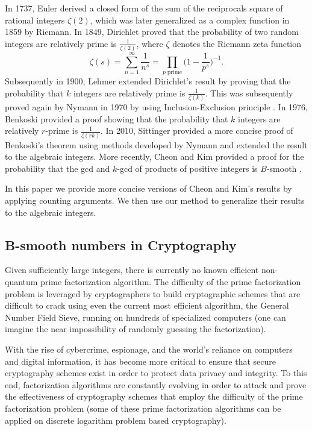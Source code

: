 \documentclass[12pt]{amsart}
\theoremstyle{definition}
\begin{document}
In 1737, Euler derived a closed form of the sum of the reciprocals square of rational integers $\zeta(2)$, which was later generalized as a complex function in 1859 by Riemann. In 1849, Dirichlet \cite{Dirichlet} proved that the probability of two random integers are relatively prime is $\frac{1}{\zeta(2)}$, where $\zeta$ denotes the Riemann zeta function
$$\zeta(s) = \sum_{n=1}^{\infty} \frac{1}{n^s} = \prod_{p \; \text{prime}} \Big(1 - \frac{1}{p^s}\Big)^{-1}.$$
Subsequently in 1900, Lehmer \cite{Lehmer} extended Dirichlet's result by proving that the probability that $k$ integers are relatively prime is $\frac{1}{\zeta(k)}$. This was subsequently proved again by Nymann in 1970 by using Inclusion-Exclusion principle \cite{Nymann}. In 1976, Benkoski \cite{Benkoski} provided a proof showing that the probability that $k$ integers are relatively $r$-prime is $\frac{1}{\zeta(rk)}$. In 2010, Sittinger \cite{Sittinger} provided a more concise proof of Benkoski's theorem using methods developed by Nymann and extended the result to the algebraic integers. More recently, Cheon and Kim provided a proof for the probability that the gcd and $k$-gcd of products of positive integers is $B$-smooth \cite{Cheon}.

In this paper we provide more concise versions of Cheon and Kim's results by applying counting arguments. We then use our method to generalize their results to the algebraic integers. 

\subsection{B-smooth numbers in Cryptography}
Given sufficiently large integers, there is currently no known efficient non-quantum prime factorization algorithm.
The difficulty of the prime factorization problem is leveraged by cryptographers to build cryptographic schemes that are difficult to crack using even the current most efficient algorithm, the General Number Field Sieve, running on hundreds of specialized computers (one can imagine the near impossibility of randomly guessing the factorization). 

With the rise of cybercrime, espionage, and the world's reliance on computers and digital information, it has become more critical to ensure that secure cryptography schemes exist in order to protect data privacy and integrity. To this end, factorization algorithms are constantly evolving in order to attack and prove the effectiveness of cryptography schemes that employ the difficulty of the prime factorization problem (some of these prime factorization algorithms can be applied on discrete logarithm problem based cryptography).
\end{document}
